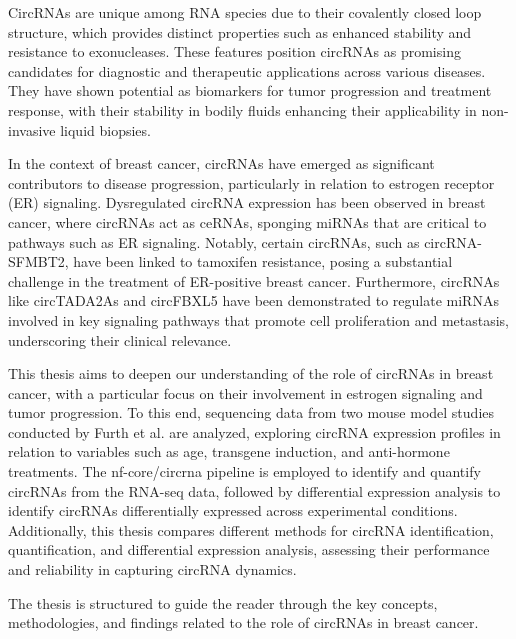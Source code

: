 CircRNAs are unique among RNA species due to their covalently closed loop
structure, which provides distinct properties such as enhanced stability and
resistance to exonucleases.
These features position circRNAs as promising candidates for diagnostic and
therapeutic applications across various
diseases\supercite{ma_circular_2020,hoque_exploring_2023,wilusz_circular_2017}.
They have shown potential as biomarkers for tumor progression and treatment
response\supercite{bao_prognostic_2020,ren_construction_2017}, with their
stability in bodily fluids enhancing their applicability in non-invasive liquid
biopsies\supercite{bao_prognostic_2020,zhang_circular_2018}.

In the context of breast cancer, circRNAs have emerged as significant
contributors to disease progression, particularly in relation to estrogen
receptor (ER) signaling.
Dysregulated circRNA expression has been observed in breast cancer, where
circRNAs act as ceRNAs, sponging miRNAs that are critical to pathways such as
ER signaling\supercite{nair_circular_2016,xu_circrna_2022}.
Notably, certain circRNAs, such as circRNA-SFMBT2, have been linked to
tamoxifen resistance, posing a substantial challenge in the treatment of
ER-positive breast cancer\supercite{li_circrna-sfmbt2_2023}.
Furthermore, circRNAs like circTADA2As and circFBXL5 have been demonstrated to
regulate miRNAs involved in key signaling pathways that promote cell
proliferation and metastasis, underscoring their clinical
relevance\supercite{xu_circtada2as_2019,gao_hsa_circrna_0006528_2019}.

This thesis aims to deepen our understanding of the role of circRNAs in breast
cancer, with a particular focus on their involvement in estrogen signaling and
tumor progression.
To this end, sequencing data from two mouse model studies conducted by Furth et
al.
\supercite{furth_esr1_2023,furth_overexpression_2023}
are analyzed, exploring circRNA expression profiles in relation to variables
such as age, transgene induction, and anti-hormone treatments.
The nf-core/circrna pipeline\supercite{digby_nf-corecircrna_2023} is employed
to identify and quantify circRNAs from the RNA-seq data, followed by
differential expression analysis to identify circRNAs differentially expressed
across experimental conditions.
Additionally, this thesis compares different methods for circRNA
identification, quantification, and differential expression analysis, assessing
their performance and reliability in capturing circRNA dynamics.

\medskip
\noindent The thesis is structured to guide the reader through the key
concepts,
methodologies, and findings related to the role of circRNAs in breast cancer.

